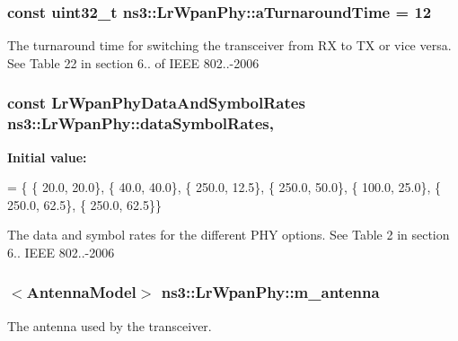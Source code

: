 \subsubsection[{\texorpdfstring{a\+Turnaround\+Time}{aTurnaroundTime}}]{\setlength{\rightskip}{0pt plus 5cm}const uint32\+\_\+t ns3\+::\+Lr\+Wpan\+Phy\+::a\+Turnaround\+Time = 12\hspace{0.3cm}{\ttfamily [static]}}\hypertarget{classns3_1_1LrWpanPhy_a8236b734a3ecb7d0c7528e693e80930d}{}\label{classns3_1_1LrWpanPhy_a8236b734a3ecb7d0c7528e693e80930d}
The turnaround time for switching the transceiver from RX to TX or vice versa. See Table 22 in section 6.. of I\+E\+EE 802..-\/2006 
\subsubsection[{\texorpdfstring{data\+Symbol\+Rates}{dataSymbolRates}}]{\setlength{\rightskip}{0pt plus 5cm}const {\bf Lr\+Wpan\+Phy\+Data\+And\+Symbol\+Rates} ns3\+::\+Lr\+Wpan\+Phy\+::data\+Symbol\+Rates\hspace{0.3cm}{\ttfamily [static]}, {\ttfamily [protected]}}\hypertarget{classns3_1_1LrWpanPhy_a28fa5c94a795cfc6c086024110a33b9d}{}\label{classns3_1_1LrWpanPhy_a28fa5c94a795cfc6c086024110a33b9d}
{\bfseries Initial value\+:}
\begin{DoxyCode}
= \{ \{ 20.0, 20.0\},
                                  \{ 40.0, 40.0\},
                                  \{ 250.0, 12.5\},
                                  \{ 250.0, 50.0\},
                                  \{ 100.0, 25.0\},
                                  \{ 250.0, 62.5\},
                                  \{ 250.0, 62.5\}\}
\end{DoxyCode}
The data and symbol rates for the different P\+HY options. See Table 2 in section 6.. I\+E\+EE 802..-\/2006 
\subsubsection[{\texorpdfstring{m\+\_\+antenna}{m_antenna}}]{$<${\bf Antenna\+Model}$>$ ns3\+::\+Lr\+Wpan\+Phy\+::m\+\_\+antenna\hspace{0.3cm}{\ttfamily [private]}}\hypertarget{classns3_1_1LrWpanPhy_a190f9ce3b27fed0de2be87412387f8ba}{}\label{classns3_1_1LrWpanPhy_a190f9ce3b27fed0de2be87412387f8ba}
The antenna used by the transceiver. 
